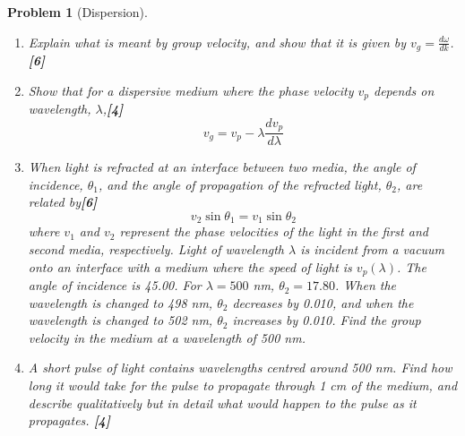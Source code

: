 \documentclass[a4paper]{article}
\theoremstyle{new}
\newtheorem{qns}{Problem}[subsection]
\begin{document}
\begin{qns}[Dispersion]\leavevmode
\begin{enumerate}[label=(\roman*)]
\item Explain what is meant by group velocity, and show that it is given by $v_g=\frac{d\omega}{dk}$.\hfill\textbf{[6]}
\item Show that for a dispersive medium where the phase velocity $v_p$ depends on wavelength, $\lambda$,\hfill\textbf{[4]}
$$v_g=v_p-\lambda\frac{dv_p}{d\lambda}$$
\item When light is refracted at an interface between two media, the angle of incidence, $\theta_1$, and the angle of propagation of the refracted light, $\theta_2$, are related by\hfill\textbf{[6]}
$$v_2\sin\theta_1=v_1\sin\theta_2$$
where $v_1$ and $v_2$ represent the phase velocities of the light in the first and second media, respectively. Light of wavelength $\lambda$ is incident from a vacuum onto an interface with a medium where the speed of light is $v_p(\lambda)$. The angle of incidence is 45.00\degree. For $\lambda=500$ nm, $\theta_2=17.80$\degree. When the wavelength is changed to 498 nm, $\theta_2$ decreases by 0.010\degree, and when the wavelength is changed to 502 nm, $\theta_2$ increases by 0.010\degree. Find the group velocity in the medium at a wavelength of 500 nm.
\item A short pulse of light contains wavelengths centred around 500 nm. Find how long it would take for the pulse to propagate through 1 cm of the medium, and describe qualitatively but in detail what would happen to the pulse as it propagates. \hfill\textbf{[4]}
\end{enumerate}
\end{qns}
\end{document}

